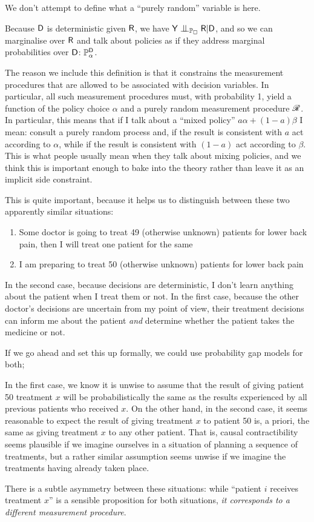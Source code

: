 We don't attempt to define what a ``purely random'' variable is here.

Because $\mathsf{D}$ is deterministic given $\mathsf{R}$, we have $\RV{Y}\CI_{\prob{P}_\square}\RV{R}|\RV{D}$, and so we can marginalise over $\mathsf{R}$ and talk about policies as if they address marginal probabilities over $\mathsf{D}$: $\mathbb{P}_\alpha^{\mathsf{D}}$.

The reason we include this definition is that it constrains the measurement procedures that are allowed to be associated with decision variables. In particular, all such measurement procedures must, with probability 1, yield a function of the policy choice $\alpha$ and a purely random measurement procedure $\mathscr{R}$. In particular, this means that if I talk about a ``mixed policy'' $a\alpha+(1-a)\beta$ I mean: consult a purely random process and, if the result is consistent with $a$ act according to $\alpha$, while if the result is consistent with $(1-a)$ act according to $\beta$. This is what people usually mean when they talk about mixing policies, and we think this is important enough to bake into the theory rather than leave it as an implicit side constraint.

This is quite important, because it helps us to distinguish between these two apparently similar situations:

\begin{enumerate}
    \item Some doctor is going to treat 49 (otherwise unknown) patients for lower back pain, then I will treat one patient for the same
    \item I am preparing to treat 50 (otherwise unknown) patients for lower back pain
\end{enumerate}

In the second case, because decisions are deterministic, I don't learn anything about the patient when I treat them or not. In the first case, because the other doctor's decisions are uncertain from my point of view, their treatment decisions can inform me about the patient \emph{and} determine whether the patient takes the medicine or not.

If we go ahead and set this up formally, we could use probability gap models for both; 

In the first case, we know it is unwise to assume that the result of giving patient 50 treatment $x$ will be probabilistically the same as the results experienced by all previous patients who received $x$. On the other hand, in the second case, it seems reasonable to expect the result of giving treatment $x$ to patient 50 is, a priori, the same as giving treatment $x$ to any other patient. That is, causal contractibility seems plausible if we imagine ourselves in a situation of planning a sequence of treatments, but a rather similar assumption seems unwise if we imagine the treatments having already taken place.

There is a subtle asymmetry between these situations: while ``patient $i$ receives treatment $x$'' is a sensible proposition for both situations, \emph{it corresponds to a different measurement procedure}.  